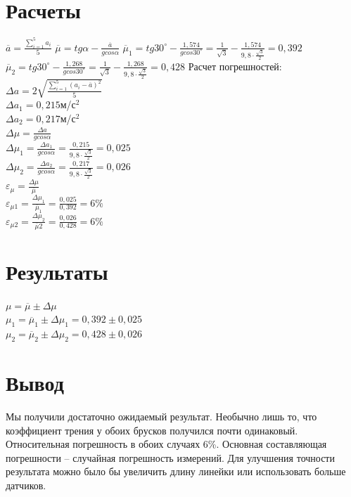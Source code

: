 \documentclass[12pt]{article}
\begin{document}
	\section{Расчеты}
	$\overline{a}=\frac{\sum\limits_{i=1}^{5} a_i}{5}$
	\newline
	$\overline{\mu}=tg\alpha-\frac{\overline{a}}{gcos\alpha}$
	\newline
	$\overline{\mu}_1=tg30^{\circ}-\frac{1,574}{gcos30^{\circ}}=\frac{1}{\sqrt{3}}-\frac{1,574}{9,8\cdot\frac{\sqrt{3}}{2}}=0,392$
	\newline
	$\overline{\mu}_2=tg30^{\circ}-\frac{1,268}{gcos30^{\circ}}=\frac{1}{\sqrt{3}}-\frac{1,268}{9,8\cdot\frac{\sqrt{3}}{2}}=0,428$
	\newline
	Расчет погрешностей:\\
	$\Delta a=2\sqrt{\frac{\sum \limits_{i=1}^{5} (a_i-\overline{a})^2}{5}}$\\
	$\Delta a_1=0,215$м/с$^2$\\
	$\Delta a_2=0,217$м/с$^2$\\
	$\Delta \mu=\frac{\Delta a}{gcos\alpha}$\\
	$\Delta \mu_1=\frac{\Delta a_1}{gcos\alpha}=\frac{0,215}{9,8\cdot\frac{\sqrt{3}}{2}}=0,025$\\
	$\Delta \mu_2=\frac{\Delta a_2}{gcos\alpha}=\frac{0,217}{9,8\cdot\frac{\sqrt{3}}{2}}=0,026$\\
	$\varepsilon_\mu=\frac{\Delta \mu}{\overline{\mu}}$\\
	$\varepsilon_{\mu1}=\frac{\Delta {\mu_1}}{\overline{\mu}_1}=\frac{0,025}{0,392}=6\%$\\
	$\varepsilon_{\mu2}=\frac{\Delta {\mu_2}}{\overline{\mu}2}=\frac{0,026}{0,428}=6\%$\\
	\section{Результаты}
	$\mu=\overline{\mu}\pm \Delta \mu$\\
	$\mu_1=\overline{\mu}_1\pm \Delta \mu_1=0,392\pm0,025$\\
	$\mu_2=\overline{\mu}_2\pm \Delta \mu_2=0,428\pm0,026$\\
	\section{Вывод}
	Мы получили достаточно ожидаемый результат. Необычно лишь то, что коэффициент трения у обоих брусков получился почти одинаковый. Относительная погрешность в обоих случаях 6\%. Основная составляющая погрешности -- случайная погрешность измерений. Для улучшения точности результата можно было бы увеличить длину линейки или использовать больше датчиков.
	
\end{document}
